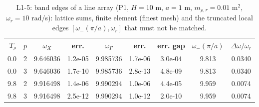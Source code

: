 \begin{table}[htbp]
\centering
\caption{L1-5: band edges of a line array (P1, $H = 10$ m, $a = 1$ m, $m_{\rho,r} = 0.01$ m$^2$, $\omega_r = 10$ rad/s): lattice sums, finite element (finest mesh) and the truncated local edges $[\omega_-(\pi/a), \omega_r]$ that must not be matched.}
\label{tab:L1-5}
\begin{tabular}{rrccccccc}
\toprule
$T_\rho$ & $p$ & $\omega_X$ & err. & $\omega_\Gamma$ & err. & err. gap & $\omega_-(\pi/a)$ & $\Delta\omega/\omega_r$ \\
\midrule
0.0 & 2 & 9.646036 & 1.2e-05 & 9.985736 & 1.7e-06 & 3.0e-04 & 9.813 & 0.0340 \\
0.0 & 3 & 9.646036 & 1.7e-10 & 9.985736 & 2.8e-13 & 4.8e-09 & 9.813 & 0.0340 \\
9.8 & 2 & 9.916498 & 1.4e-06 & 9.990294 & 1.0e-06 & 4.4e-05 & 9.959 & 0.0074 \\
9.8 & 3 & 9.916498 & 2.5e-12 & 9.990294 & 1.0e-12 & 2.0e-10 & 9.959 & 0.0074 \\
\bottomrule
\end{tabular}
\end{table}
